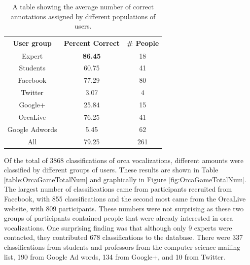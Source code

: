 \begin{table}
\begin{tabular}{|c|c|c|}
\hline
User group & Percent Correct       & \# People \\
\hline
Expert           &	\textbf{86.45} & 18        \\
Students         &	60.75          & 41        \\
Facebook         &	77.29          & 80        \\
Twitter          &	3.07           & 4         \\
Google+          &	25.84          & 15        \\
OrcaLive         &	76.25          & 41        \\
Google Adwords   &	5.45           & 62        \\
\hline
All              &	79.25          & 261       \\
\hline
\end{tabular}
\caption{A table showing the average number of correct annotations
  assigned by different populations of users.}
\label{table:percentCorrect}
\end{table}

Of the total of 3868 classifications of orca vocalizations, different
amounts were classified by different groups of users.  These results
are shown in Table \ref{table:OrcaGameTotalNum} and graphically in
Figure \ref{fig:OrcaGameTotalNum}.  The largest number of
classifications came from participants recruited from Facebook, with
855 classifications and the second most came from the OrcaLive
website, with 809 participants.  These numbers were not surprising as
these two groups of participants contained people that were already
interested in orca vocalizations.  One surprising finding was that
although only 9 experts were contacted, they contributed 678
classifications to the database.  There were 337 classifications from
students and professors from the computer science mailing list, 190
from Google Ad words, 134 from Google+, and 10 from Twitter.

